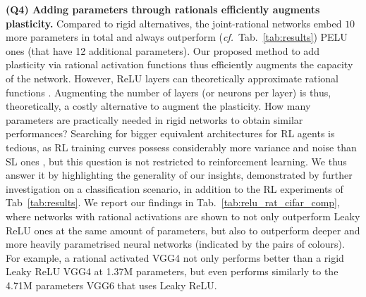 \documentclass[accepted]{article}
\theoremstyle{plain}
\theoremstyle{definition}
\theoremstyle{remark}
\newcommand{\cf}{\emph{cf.}~}
\begin{document}
\textbf{(Q4) Adding parameters through rationals efficiently augments plasticity.}
Compared to rigid alternatives, the joint-rational networks embed $10$ more parameters in total and always outperform (\cf Tab.~\ref{tab:results}) PELU ones (that have 12 additional parameters). Our proposed method to add plasticity via rational activation functions thus efficiently augments the capacity of the network. However, ReLU layers can theoretically approximate rational functions \cite{telgarsky2017neural}. Augmenting the number of layers (or neurons per layer) is thus, theoretically, a costly alternative to augment the plasticity. How many parameters are practically needed in rigid networks to obtain similar performances? Searching for bigger equivalent architectures for RL agents is tedious, as RL training curves possess considerably more variance and noise than SL ones \cite{miao2021rldarts}, but this question is not restricted to reinforcement learning. We thus answer it by highlighting the generality of our insights, demonstrated by further investigation on a classification scenario, in addition to the RL experiments of Tab~\ref{tab:results}. We report our findings in Tab.~\ref{tab:relu_rat_cifar_comp}, where networks with rational activations are shown to not only outperform Leaky ReLU ones at the same amount of parameters, but also to outperform deeper and more heavily parametrised neural networks (indicated by the pairs of colours). For example, a rational activated VGG4 not only performs better than a rigid Leaky ReLU VGG4 at 1.37M parameters, but even performs similarly to the 4.71M parameters VGG6 that uses Leaky ReLU.
\end{document}
